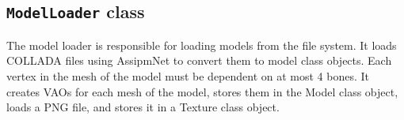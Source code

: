\subsection{\texttt{ModelLoader} class}\label{subsec:model_loader-class}

The model loader is responsible for loading models from the file system.
It loads COLLADA files using AssipmNet to convert them to model class objects.
Each vertex in the mesh of the model must be dependent on at most 4 bones.
It creates VAOs for each mesh of the model, stores them in the Model class object, loads a PNG file, and stores it in a Texture class object.
